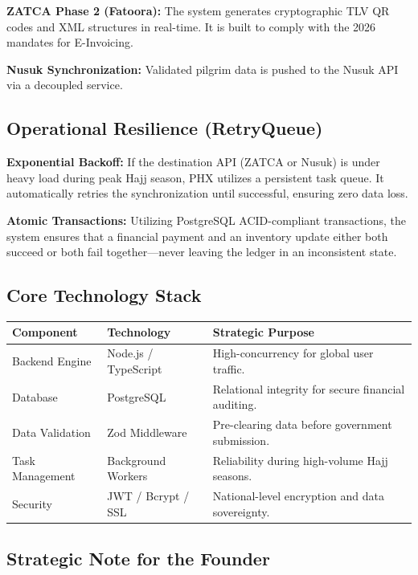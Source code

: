 \documentclass[11pt,a4paper]{article}
\begin{document}
\textbf{ZATCA Phase 2 (Fatoora):} The system generates cryptographic TLV QR codes and XML structures in real-time. It is built to comply with the 2026 mandates for E-Invoicing.

\textbf{Nusuk Synchronization:} Validated pilgrim data is pushed to the Nusuk API via a decoupled service.

\subsection{Operational Resilience (RetryQueue)}

\textbf{Exponential Backoff:} If the destination API (ZATCA or Nusuk) is under heavy load during peak Hajj season, PHX utilizes a persistent task queue. It automatically retries the synchronization until successful, ensuring zero data loss.

\textbf{Atomic Transactions:} Utilizing PostgreSQL ACID-compliant transactions, the system ensures that a financial payment and an inventory update either both succeed or both fail together---never leaving the ledger in an inconsistent state.

\subsection*{Core Technology Stack}

\begin{center}
\begin{tabular}{|p{3.5cm}|p{3.5cm}|p{7cm}|}
\hline
\textbf{Component} & \textbf{Technology} & \textbf{Strategic Purpose} \\
\hline
Backend Engine & Node.js / TypeScript & High-concurrency for global user traffic. \\
\hline
Database & PostgreSQL & Relational integrity for secure financial auditing. \\
\hline
Data Validation & Zod Middleware & Pre-clearing data before government submission. \\
\hline
Task Management & Background Workers & Reliability during high-volume Hajj seasons. \\
\hline
Security & JWT / Bcrypt / SSL & National-level encryption and data sovereignty. \\
\hline
\end{tabular}
\end{center}

\vspace{1cm}

\subsection*{Strategic Note for the Founder}
\end{document}
